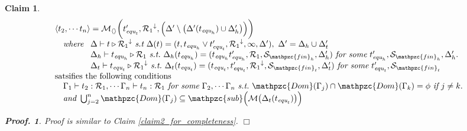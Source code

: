 \documentclass[12pt]{article}
\newtheorem{Claim}{Claim}[section]
\newtheorem{Proof}{Proof.}
\begin{document}
\begin{Claim}
  \label{claim3_for_completeness}
  \[ \begin{array}{l}
      \langle t_2, \cdots t_n\rangle = \mathcal{M}_{\langle\rangle}\biggl(
       t'_{\text{\it equ}_t}, {\mathcal{R}_1}^\downarrow, \Bigl(
        \Delta' \setminus \bigl(\Delta'(t_{\text{\it equ}_h}) \cup
         \Delta'_h \bigr) \Bigr) \biggr)  \\
          \quad \text{\it where}\ \begin{array}[t]{l}
           \Delta \vdash t \triangleright {\mathcal{R}_1}^\downarrow\
            \text{\it s.t}\ \Delta(t) = (t, t_{\text{\it equ}_h} \vee
             t'_{\text{\it equ}_t}, {\mathcal{R}_1}^\downarrow, \infty,
              \Delta' ),\ \Delta' = \Delta_h \cup \Delta'_t  \\
           \Delta_h \vdash t_{\text{\it equ}_h} \triangleright
            \mathcal{R}_1\ \text{\it s.t.}\ 
             \Delta_h(t_{\text{\it equ}_h}) = (t_{\text{\it equ}_h}
              t'_{\text{\it equ}_h}, \mathcal{R}_1,
               \mathcal{S}_{\mathpzc{fin}_h}, \Delta'_h )\
                \text{\it for some}\ t'_{\text{\it equ}_h},
                 \mathcal{S}_{\mathpzc{fin}_h}, \Delta'_h.  \\ 
           \Delta_t \vdash t_{\text{\it equ}_t} \triangleright
            {\mathcal{R}_1}^\downarrow\ \text{\it s.t.}\
             \Delta_t(t_{\text{\it equ}_t}) =(t_{\text{\it equ}_t},
              t'_{\text{\it equ}_t}, {\mathcal{R}_1}^\downarrow,
               \mathcal{S}_{\mathpzc{fin}_t}, \Delta'_t)\
                \text{\it for some}\ t'_{\text{\it equ}_t},
                 \mathcal{S}_{\mathpzc{fin}_t}
         \end{array}  \\
      \mbox{satsifies the following conditions}\\
       \quad \Gamma_1 \vdash t_2: \mathcal{R}_1, \cdots
        \Gamma_n \vdash t_n: \mathcal{R}_1\ \text{\it for some}\
         \Gamma_2, \cdots \Gamma_n\ \text{\it s.t.}\
          \mathpzc{Dom}(\Gamma_j) \cap \mathpzc{Dom}(\Gamma_k) = \phi\
           \text{\it if}\ j \neq k.  \\
       \quad \text{\it and}\ \bigcup_{j=2}^n\mathpzc{Dom}(\Gamma_j)
        \subseteq \mathpzc{sub}\Bigl(\mathcal{M}\bigl(
         \Delta_t(t_{\text{\it equ}_t}) \bigr) \Bigr)
     \end{array}
  \]
  \begin{Proof}
    Proof is similar to Claim \ref{claim2_for_completeness}.
    $\Box$
  \end{Proof}
\end{Claim}
\end{document}
